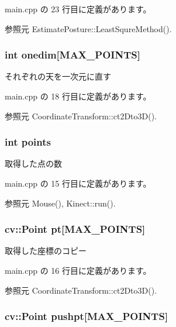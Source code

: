  main.\-cpp の 23 行目に定義があります。



参照元 Estimate\-Posture\-::\-Least\-Squre\-Method().

\subsubsection[{onedim}]{\setlength{\rightskip}{0pt plus 5cm}int onedim[{\bf M\-A\-X\-\_\-\-P\-O\-I\-N\-T\-S}]}\label{main_8cpp_a3176345ea8c2caf35db75e45801d0f03}


それぞれの天を一次元に直す 



 main.\-cpp の 18 行目に定義があります。



参照元 Coordinate\-Transform\-::ct2\-Dto3\-D().

\subsubsection[{points}]{\setlength{\rightskip}{0pt plus 5cm}int points}\label{main_8cpp_af7f8f4a4e39e09fdb5e9f02330ecabef}


取得した点の数 



 main.\-cpp の 15 行目に定義があります。



参照元 Mouse(), Kinect\-::run().

\subsubsection[{pt}]{\setlength{\rightskip}{0pt plus 5cm}cv\-::\-Point pt[{\bf M\-A\-X\-\_\-\-P\-O\-I\-N\-T\-S}]}\label{main_8cpp_ac962128d9435beddc43ca532882deef2}


取得した座標のコピー 



 main.\-cpp の 16 行目に定義があります。



参照元 Coordinate\-Transform\-::ct2\-Dto3\-D().

\subsubsection[{pushpt}]{\setlength{\rightskip}{0pt plus 5cm}cv\-::\-Point pushpt[{\bf M\-A\-X\-\_\-\-P\-O\-I\-N\-T\-S}]}\label{main_8cpp_af77f32fe5be4d28ae0d320adde8f51af}


